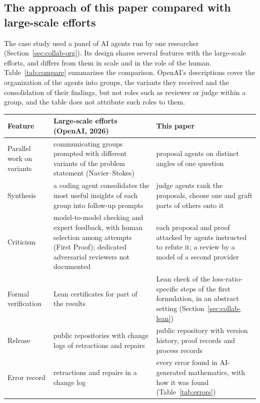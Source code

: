 \subsection{The approach of this paper compared with large-scale efforts}\label{sec:std-compare}

The case study used a panel of AI agents run by one researcher (Section~\ref{sec:collab-org}). Its design shares
several features with the large-scale efforts, and differs from them in scale and in the role of the human.
Table~\ref{tab:compare} summarizes the comparison. OpenAI's descriptions cover the organization of the agents into groups, the
variants they received and the consolidation of their findings, but not roles such as reviewer or judge within a
group, and the table does not attribute such roles to them.

\begin{table}[ht]
\centering\footnotesize
\begin{tabularx}{\textwidth}{@{}>{\raggedright\arraybackslash}p{2.6cm}>{\raggedright\arraybackslash}X>{\raggedright\arraybackslash}X@{}}
\toprule
\textbf{Feature} & \textbf{Large-scale efforts (OpenAI, 2026)} & \textbf{This paper}\\
\midrule
Parallel work on variants & communicating groups prompted with different variants of the problem statement
  (Navier--Stokes) & proposal agents on distinct angles of one question\\
Synthesis & a coding agent consolidates the most useful insights of each group into follow-up prompts & judge agents
  rank the proposals, choose one and graft parts of others onto it\\
Criticism & model-to-model checking and expert feedback, with human selection among attempts (First Proof);
  dedicated adversarial reviewers not documented & each proposal and proof attacked by agents instructed to refute
  it; a review by a model of a second provider\\
Formal verification & Lean certificates for part of the results & Lean check of the loss-ratio-specific steps of
  the first formulation, in an abstract setting (Section~\ref{sec:collab-lean})\\
Release & public repositories with change logs of retractions and repairs & public repository with version
  history, proof records and process records\\
Error record & retractions and repairs in a change log & every error found in AI-generated mathematics, with how it
  was found (Table~\ref{tab:errors})\\

\end{tabularx}
\end{table}
